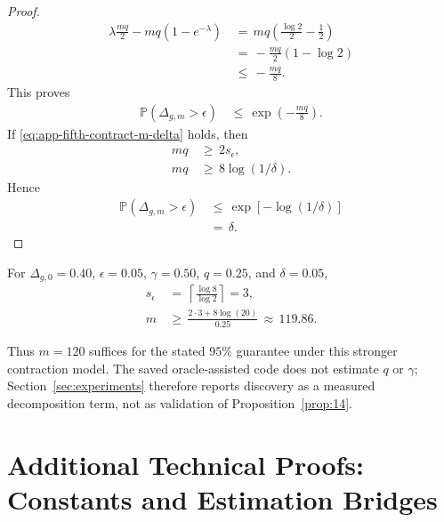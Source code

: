 \documentclass{article} %
\begin{document}
\begin{proof}
\begin{equation}
\begin{aligned}
\lambda\frac{mq}{2}
-
mq(1-e^{-\lambda})
&\,=\,
mq\left(
\frac{\log 2}{2}
-
\frac{1}{2}
\right)
\\
&\,=\,
-\frac{mq}{2}(1-\log 2)
\\
&\,\le\,
-\frac{mq}{8}.
\end{aligned}
\end{equation}
This proves
\begin{equation}
\label{eq:app-fifth-contract-proof-final-tail}
\begin{aligned}
\mathbb{P}(\Delta_{g,m}>\epsilon)
&\,\le\,
\exp\!\left(-\frac{mq}{8}\right).
\end{aligned}
\end{equation}
If \eqref{eq:app-fifth-contract-m-delta} holds, then
\begin{equation}
\label{eq:app-fifth-contract-proof-delta-conditions}
\begin{aligned}
mq
&\,\ge\,
2s_\epsilon,
\\
mq
&\,\ge\,
8\log(1/\delta).
\end{aligned}
\end{equation}
Hence
\begin{equation}
\label{eq:app-fifth-contract-proof-delta}
\begin{aligned}
\mathbb{P}(\Delta_{g,m}>\epsilon)
&\,\le\,
\exp[-\log(1/\delta)]
\\
&\,=\,
\delta.
\end{aligned}
\end{equation}
\end{proof}

For \(\Delta_{g,0}=0.40\), \(\epsilon=0.05\), \(\gamma=0.50\),
\(q=0.25\), and \(\delta=0.05\),
\begin{align}
\label{eq:app-fifth-contract-example-s}
s_\epsilon
&\,=\,
\left\lceil\frac{\log8}{\log2}\right\rceil=3,
\\
\label{eq:app-fifth-contract-example-m}
m
&\,\ge\,
\frac{2\cdot 3+8\log(20)}{0.25}
\,\approx\,119.86.
\end{align}

Thus \(m=120\) suffices for the stated \(95\%\) guarantee under this stronger
contraction model. The saved oracle-assisted code does not estimate \(q\) or
\(\gamma\); Section~\ref{sec:experiments} therefore reports discovery as a
measured decomposition term, not as validation of Proposition~\ref{prop:14}.

\section{Additional Technical Proofs: Constants and Estimation Bridges}
\end{document}

